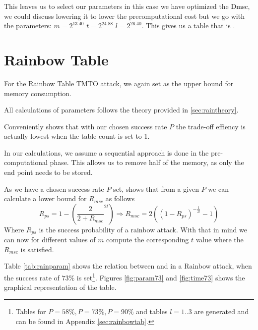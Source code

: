 This leaves us to select our parameters in this case we have optimized the Dmsc, we could discuss lowering it to lower the precomputational cost but we go with the parameters: $m=2^{13.40}$  $t=2^{24.88}$  $l=2^{26.40}$.
This gives us a table that is .
\section{Rainbow Table}
\label{sec:rainbowparam}
For the Rainbow Table TMTO attack, we again set  as the
upper bound for memory consumption.

All calculations of parameters follows the theory provided in
\ref{sec:raintheory}.

Conveniently \cite[Fig.4]{176} shows that with our chosen success rate
$P$ the trade-off effiency is actually lowest when the table count is
set to 1.

In our calculations, we assume a sequential approach is done in the
pre-computational phase. This allows us to remove half of the memory,
as only the end point needs to be stored.

As we have a chosen success rate $P$ set, \cite[Proposition
29]{176} shows that from a given $P$ we can calculate a lower bound
for $R_{msc}$ as follows
\[R_{ps} = 1 - \left( \frac{2}{2 + R_{msc}}^{2l} \right) \Rightarrow R_{msc} = 2 ((1 - R_{ps})^{-\frac{1}{2l}} - 1)\]
Where $R_{ps}$ is the success probability of a rainbow attack. With
that in mind we can now for different values of $m$ compute the
corresponding $t$ value where the $R_{msc}$ is satisfied.

Table \ref{tab:rainparam} shows the relation between  and
 in a Rainbow attack, when the success rate of $73\%$ is set\footnote{Tables for $P = 58\%, P = 73\%, P = 90\%$ and tables $l=1..3$ are generated and can be
found in Appendix \ref{sec:rainbowtab}.}. Figures \ref{fig:param73}
and \ref{fig:time73} shows the graphical representation of the table.

